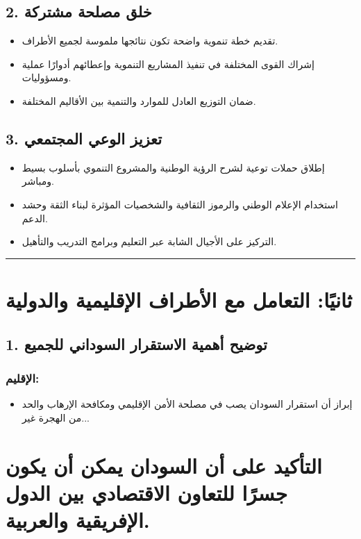 \documentclass[12pt]{article}
\begin{document}
\subsection{2. خلق مصلحة مشتركة}
\begin{itemize}
    \item تقديم خطة تنموية واضحة تكون نتائجها ملموسة لجميع الأطراف.
    \item إشراك القوى المختلفة في تنفيذ المشاريع التنموية وإعطائهم أدوارًا عملية ومسؤوليات.
    \item ضمان التوزيع العادل للموارد والتنمية بين الأقاليم المختلفة.
\end{itemize}

\subsection{3. تعزيز الوعي المجتمعي}
\begin{itemize}
    \item إطلاق حملات توعية لشرح الرؤية الوطنية والمشروع التنموي بأسلوب بسيط ومباشر.
    \item استخدام الإعلام الوطني والرموز الثقافية والشخصيات المؤثرة لبناء الثقة وحشد الدعم.
    \item التركيز على الأجيال الشابة عبر التعليم وبرامج التدريب والتأهيل.
\end{itemize}

\hrule

\section{ثانيًا: التعامل مع الأطراف الإقليمية والدولية}
\subsection{1. توضيح أهمية الاستقرار السوداني للجميع}
\subsubsection{الإقليم:}
\begin{itemize}
    \item إبراز أن استقرار السودان يصب في مصلحة الأمن الإقليمي ومكافحة الإرهاب والحد من الهجرة غير...
\end{itemize}



\section{التأكيد على أن السودان يمكن أن يكون جسرًا للتعاون الاقتصادي بين الدول الإفريقية والعربية.}
\end{document}
